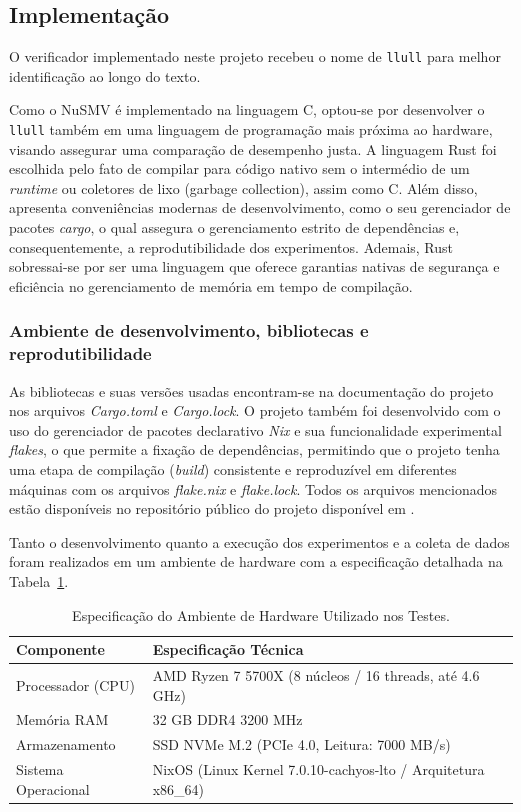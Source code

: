 \documentclass[cic,tc]{infufrgs}
\begin{document}
	\subsection{Implementação}
	O verificador implementado neste projeto recebeu o nome de \texttt{llull} para melhor identificação ao longo do texto.
	
	Como o NuSMV é implementado na linguagem C, optou-se por desenvolver o \texttt{llull} também em uma linguagem de programação mais próxima ao hardware, visando assegurar uma comparação de desempenho justa. 
	A linguagem Rust foi escolhida pelo fato de compilar para código nativo sem o intermédio de um \textit{runtime} ou coletores de lixo (garbage collection), assim como C.
	Além disso, apresenta conveniências modernas de desenvolvimento, como o seu gerenciador de pacotes \textit{cargo}, o qual assegura o gerenciamento estrito de dependências e, consequentemente, a reprodutibilidade dos experimentos. 
	Ademais, Rust sobressai-se por ser uma linguagem que oferece garantias nativas de segurança e eficiência no gerenciamento de memória em tempo de compilação.
	
	\subsubsection{Ambiente de desenvolvimento, bibliotecas e reprodutibilidade}
	As bibliotecas e suas versões usadas encontram-se na documentação do projeto nos arquivos \textit{Cargo.toml} e \textit{Cargo.lock}.
	O projeto também foi desenvolvido com o uso do gerenciador de pacotes declarativo \textit{Nix} e sua funcionalidade experimental \textit{flakes}, o que permite a fixação de dependências, permitindo que o projeto tenha uma etapa de compilação (\textit{build}) consistente e reproduzível em diferentes máquinas com os arquivos \textit{flake.nix} e \textit{flake.lock}. Todos os arquivos mencionados estão disponíveis no repositório público do projeto disponível em .
	
	Tanto o desenvolvimento quanto a execução dos experimentos e a coleta de dados foram realizados em um ambiente de hardware com a especificação detalhada na Tabela~\ref{tab:ambiente_hardware}.
	\begin{table}[h!]
		\centering
		\caption{Especificação do Ambiente de Hardware Utilizado nos Testes.}
		\label{tab:ambiente_hardware}
		\begin{tabular}{ll}
			\toprule  
			\textbf{Componente} & \textbf{Especificação Técnica} \\ 
			\midrule  
			Processador (CPU)   & AMD Ryzen 7 5700X (8 núcleos / 16 threads, até 4.6 GHz) \\
			Memória RAM         & 32 GB DDR4 3200 MHz \\
			Armazenamento       & SSD NVMe M.2 (PCIe 4.0, Leitura: 7000 MB/s) \\
			Sistema Operacional & NixOS (Linux Kernel 7.0.10-cachyos-lto / Arquitetura x86\_64) \\ 
			\bottomrule 
		\end{tabular}
	\end{table}
	
\end{document}
